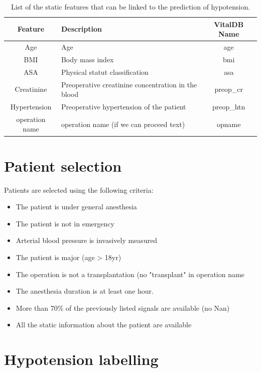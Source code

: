 \documentclass[a4paper,12pt]{article}
\begin{document}
\begin{table}
\begin{center}
\begin{tabular}{c|p{}|c}
\textbf{Feature} & \textbf{Description} & \textbf{VitalDB Name} \\
\midrule
Age & Age & age \\
BMI & Body mass index & bmi \\
ASA & Physical statut classification & asa \\
Creatinine & Preoperative creatinine concentration in the blood & preop\_cr \\
Hypertension & Preoperative hypertension of the patient & preop\_htn \\
operation name & operation name (if we can proceed text) & opname
\end{tabular}
\caption{List of the static features that can be linked to the prediction of hypotension.}
\end{center}
\end{table}

\section{Patient selection}
Patients are selected using the following criteria:

\begin{itemize}
    \item The patient is under general anesthesia
    \item The patient is not in emergency
    \item Arterial blood pressure is invasively measured
    \item The patient is major (age > 18yr)
    \item The operation is not a transplantation (no "transplant" in operation name
    \item The anesthesia duration is at least one hour.
    \item More than 70\% of the previously listed signals are available (no Nan) 
    \item All the static information about the patient are available
\end{itemize}

\section{Hypotension labelling}
\end{document}
